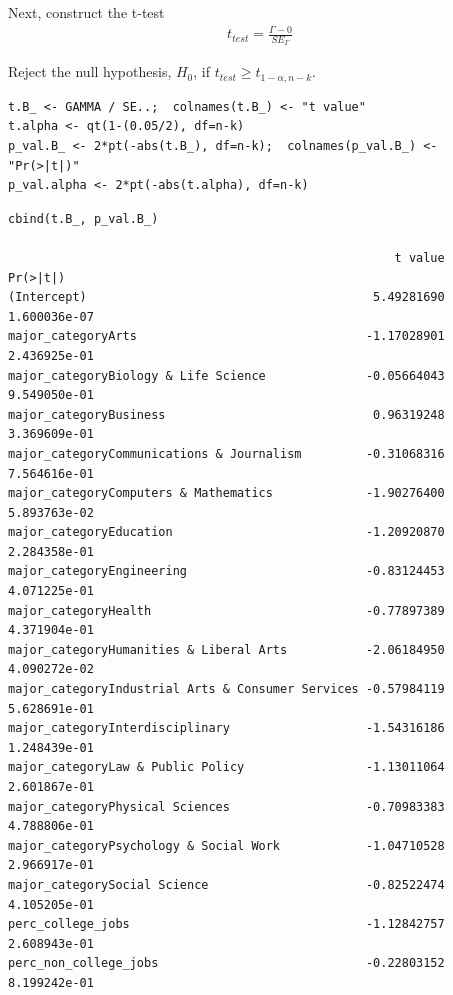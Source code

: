 \documentclass[10pt, twoside, openleft]{article}
\begin{document}
\noindent
Next, construct the t-test
\begin{equation*}
\begin{aligned}
t_{test} = \frac{ \Gamma - 0 }{ SE_{\Gamma} }
\end{aligned}
\end{equation*}
\smallskip

\noindent
Reject the null hypothesis, $H_{0}$, if $t_{test} \geq t_{1-\alpha, n-k}$.

\begin{verbatim}
t.B_ <- GAMMA / SE..;  colnames(t.B_) <- "t value"
t.alpha <- qt(1-(0.05/2), df=n-k)
p_val.B_ <- 2*pt(-abs(t.B_), df=n-k);  colnames(p_val.B_) <- "Pr(>|t|)"
p_val.alpha <- 2*pt(-abs(t.alpha), df=n-k)
\end{verbatim}

\begin{verbatim}
cbind(t.B_, p_val.B_)

                                                      t value     Pr(>|t|)
(Intercept)                                        5.49281690 1.600036e-07
major_categoryArts                                -1.17028901 2.436925e-01
major_categoryBiology & Life Science              -0.05664043 9.549050e-01
major_categoryBusiness                             0.96319248 3.369609e-01
major_categoryCommunications & Journalism         -0.31068316 7.564616e-01
major_categoryComputers & Mathematics             -1.90276400 5.893763e-02
major_categoryEducation                           -1.20920870 2.284358e-01
major_categoryEngineering                         -0.83124453 4.071225e-01
major_categoryHealth                              -0.77897389 4.371904e-01
major_categoryHumanities & Liberal Arts           -2.06184950 4.090272e-02
major_categoryIndustrial Arts & Consumer Services -0.57984119 5.628691e-01
major_categoryInterdisciplinary                   -1.54316186 1.248439e-01
major_categoryLaw & Public Policy                 -1.13011064 2.601867e-01
major_categoryPhysical Sciences                   -0.70983383 4.788806e-01
major_categoryPsychology & Social Work            -1.04710528 2.966917e-01
major_categorySocial Science                      -0.82522474 4.105205e-01
perc_college_jobs                                 -1.12842757 2.608943e-01
perc_non_college_jobs                             -0.22803152 8.199242e-01
\end{verbatim}
\end{document}
